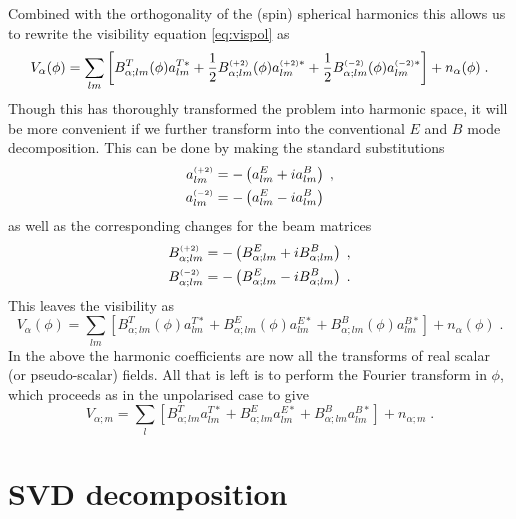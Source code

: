 \documentclass[onecolumn]{revtex4}
\begin{document}
Combined with the orthogonality of the (spin) spherical harmonics this
allows us to rewrite the visibility equation \eqref{eq:vispol} as
\begin{equation}
V_{\alpha}(\phi) = \sum_{lm} \left[B_{\alpha;lm}^T(\phi) a^{T*}_{lm} +
\frac{1}{2} B_{\alpha;lm}^{\scriptscriptstyle \left(+2\right)}(\phi) a^{{\scriptscriptstyle \left(+2\right)}*}_{lm} +
\frac{1}{2} B_{\alpha;lm}^{\scriptscriptstyle \left(-2\right)}(\phi) a^{{\scriptscriptstyle \left(-2\right)}*}_{lm}\right] + n_{\alpha}(\phi)
\; .
\end{equation}
Though this has thoroughly transformed the problem into harmonic
space, it will be more convenient if we further transform into the
conventional $E$ and $B$ mode decomposition. This can be done by
making the standard substitutions
\begin{align}
a^{\scriptscriptstyle \left(+2\right)}_{lm} & = -\left(a^E_{lm} + i a^B_{lm}\right) \; ,\\
a^{\scriptscriptstyle \left(-2\right)}_{lm} & = -\left(a^E_{lm} - i a^B_{lm}\right)
\end{align}
as well as the corresponding changes for the beam matrices
\begin{align}
  B^{\scriptscriptstyle \left(+2\right)}_{\alpha;lm} & = -\left(B^E_{\alpha;lm} + i B^B_{\alpha;lm}\right) \; ,\\
  B^{\scriptscriptstyle \left(-2\right)}_{\alpha;lm} & = -\left(B^E_{\alpha;lm} - i B^B_{\alpha;lm}\right)
  \; .
\end{align}
This leaves the visibility as
\begin{equation}
V_{\alpha}(\phi) = \sum_{lm} \left[B_{\alpha;lm}^T(\phi) a^{T*}_{lm} +
B_{\alpha;lm}^E(\phi) a^{E*}_{lm} + B_{\alpha;lm}^B(\phi)
a^{B*}_{lm}\right] + n_{\alpha}(\phi)
\; .
\end{equation}
In the above the harmonic coefficients are now all the transforms of real scalar
(or pseudo-scalar) fields. All that is left is to perform the Fourier transform
in $\phi$, which proceeds as in the unpolarised case to give
\begin{equation}
V_{\alpha; m} = \sum_{l} \left[B_{\alpha;lm}^T a^{T*}_{lm} +
B_{\alpha;lm}^E a^{E*}_{lm} + B_{\alpha;lm}^B
a^{B*}_{lm}\right] + n_{\alpha; m}
\; .
\end{equation}



\section{SVD decomposition}
\end{document}
